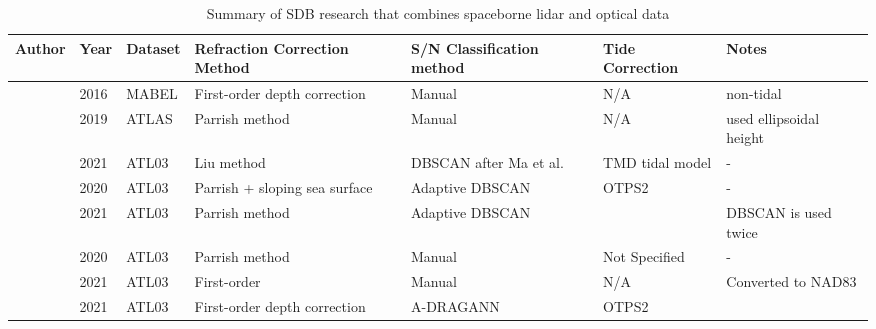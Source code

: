 \begin{landscape}
      \begin{table}
            \label{research-summary}
            \caption{Summary of SDB research that combines spaceborne lidar and optical data}
            \raggedright
            \begin{tabular}{lllp{3cm}p{3cm}ll}
                  \midrule
                  Author                                               & Year & Dataset & Refraction Correction Method  & S/N Classification method      & Tide Correction & Notes                        \\
                  \hline
                  \citeauthor{Forfinski-Sarkozi2016} & 2016 & MABEL   & First-order depth correction  & Manual                         & N/A             & non-tidal                    \\
                  \citeauthor{Parrish2019}                    & 2019 & ATLAS   & Parrish method                & Manual                         & N/A             & used  ellipsoidal height     \\
                  \citeauthor{Liu2021}                             & 2021 & ATL03   & Liu method                    & DBSCAN after Ma et al.         & TMD tidal model & -                            \\
                  \citeauthor{Ma2020}                             & 2020 & ATL03   & Parrish + sloping sea surface & Adaptive DBSCAN                & OTPS2           & -                            \\
                  \citeauthor{Xie2021}                            & 2021 & ATL03   & Parrish method                & Adaptive DBSCAN                &                 & DBSCAN  is used twice        \\
                  \citeauthor{Thomas2021d}                     & 2020 & ATL03   & Parrish method                & Manual                         & Not Specified   & -                            \\
                  \citeauthor{Albright2021}             & 2021 & ATL03   & First-order                   & Manual                         & N/A             & Converted to NAD83           \\
                  \citeauthor{Cao2021}                            & 2021 & ATL03   & First-order depth correction  & A-DRAGANN                      & OTPS2           &                              \\

\end{tabular}
\end{table}
\end{landscape}
